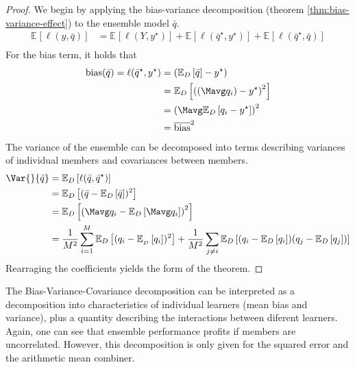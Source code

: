 \documentclass[../main.tex]{subfiles}
\begin{document}
\begin{proof}
We begin by applying the bias-variance decomposition (theorem  \ref{thm:bias-variance-effect}) to the ensemble model $\bar{q}$.
\begin{align*}
\mathbb{E}_{}\left[ \ell(y, \bar{q})  \right]  
&= \mathbb{E}_{}\left[ \ell(Y, y^\star) \right]  + \mathbb{E}_{}\left[ \ell(\bar{q}^\star, y^\star) \right] + \mathbb{E}_{}\left[ \ell(\bar{q}^\star, \bar{q}) \right]  \\
\end{align*}
For the bias term, it holds that
\begin{align*}
\text{bias} (\bar{q}) = 
\ell(\bar{q}^\star, y^\star)
&=  (\mathbb{E}_{D}\left[ \bar{q} \right]  - y^\star)  \\
&=  \mathbb{E}_{D}\left[ \left(\left(\Mavg q_{i}\right) - y^\star\right)^2 \right]   \\
&=  \left(\Mavg \mathbb{E}_{D}\left[ q_{i} - y^\star \right] \right)^2   \\
&=  \overline{\text{bias} }^2   
\end{align*}
The variance of the ensemble can be decomposed into terms describing variances of individual members and covariances between members.
\begin{align*}
\Var{}{\bar{q}} 
&= \mathbb{E}_{D}\left[ \ell(\bar{q}, \bar{q}^\star) \right] \\
&= \mathbb{E}_{D}\left[ (\bar{q} - \mathbb{E}_{D}\left[ \bar{q} \right] )^2 \right]  \\
&= \mathbb{E}_{D}\left[ \left(  \Mavg q_{i} - \mathbb{E}_{D}\left[ \Mavg q_{i} \right]  \right)^2 \right] \\
&= \frac{1}{M^2} \sum_{i=1}^M \mathbb{E}_{D}\left[ (q_{i} - \mathbb{E}_{_{D}}\left[ q_{i} \right] )^2 \right] 
+ \frac{1}{M^2} \sum_{j \not=i} \mathbb{E}_{D}\left[ (q_{i} - \mathbb{E}_{D}\left[ q_{i} \right] ) (q_{j} - \mathbb{E}_{D}\left[ q_{j} \right] ) \right] 
\end{align*}
Rearraging the coefficients yields the form of the theorem.
\end{proof}
The Bias-Variance-Covariance decomposition can be interpreted as a decomposition into characteristics of individual learners (mean bias and variance), plus a quantity describing the interactions between diferent learners. Again, one can see that ensemble performance profits if members are uncorrelated.
However, this decomposition is only given for the squared error and the arithmetic mean combiner. 
\end{document}
